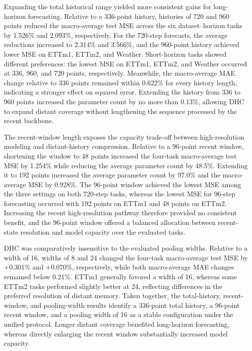 Expanding the total historical range yielded more consistent gains for long-horizon forecasting. Relative to a 336-point history, histories of 720 and 960 points reduced the macro-average test MSE across the six dataset--horizon tasks by 1.526\% and 2.093\%, respectively. For the 720-step forecasts, the average reductions increased to 2.314\% and 3.566\%, and the 960-point history achieved lower MSE on ETTm1, ETTm2, and Weather. Short-horizon tasks showed different preferences: the lowest MSE on ETTm1, ETTm2, and Weather occurred at 336, 960, and 720 points, respectively. Meanwhile, the macro-average MAE change relative to 336 points remained within 0.622\% for every history length, indicating a stronger effect on squared error. Extending the history from 336 to 960 points increased the parameter count by no more than 0.13\%, allowing DHC to expand distant coverage without lengthening the sequence processed by the recent backbone.

The recent-window length exposes the capacity trade-off between high-resolution modeling and distant-history compression. Relative to a 96-point recent window, shortening the window to 48 points increased the four-task macro-average test MSE by 1.254\% while reducing the average parameter count by 48.5\%. Extending it to 192 points increased the average parameter count by 97.0\% and the macro-average MSE by 0.928\%. The 96-point window achieved the lowest MSE among the three settings on both 720-step tasks, whereas the lowest MSE for 96-step forecasting occurred with 192 points on ETTm1 and 48 points on ETTm2. Increasing the recent high-resolution pathway therefore provided no consistent benefit, and the 96-point window offered a balanced allocation between recent-state resolution and model capacity over the evaluated tasks.

DHC was comparatively insensitive to the evaluated pooling widths. Relative to a width of 16, widths of 8 and 24 changed the four-task macro-average test MSE by +0.301\% and +0.070\%, respectively, while both macro-average MAE changes remained below 0.21\%. ETTm1 generally favored a width of 16, whereas some ETTm2 tasks performed slightly better at 24, reflecting differences in the preferred resolution of distant memory. Taken together, the total-history, recent-window, and pooling-width results identify a 336-point total history, a 96-point recent window, and a pooling width of 16 as a stable configuration under the unified protocol. Longer distant coverage benefited long-horizon forecasting, whereas directly enlarging the recent window substantially increased model capacity.

